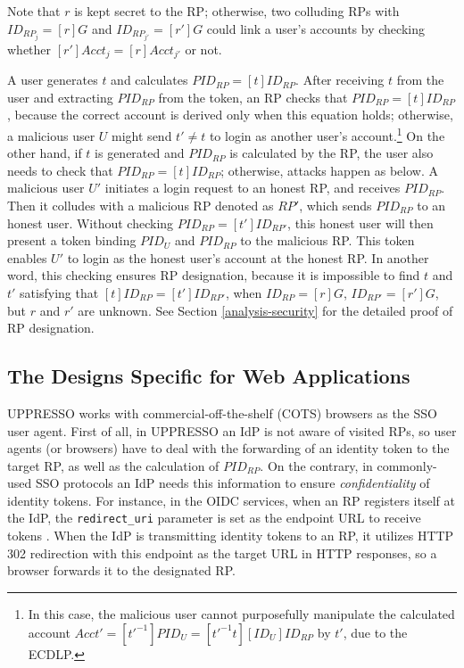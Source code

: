 Note that $r$ is kept secret to the RP; otherwise, two colluding RPs with $ID_{RP_j} = [r]G$ and $ID_{RP_{j'}} = [r']G$ could link a user's accounts by checking whether $[r']Acct_j = [r]Acct_{j'}$ or not.

A user generates $t$ and calculates $PID_{RP} = [t]ID_{RP}$.
After receiving $t$ from the user and extracting $PID_{RP}$ from the token,
    an RP checks that $PID_{RP} = [t]ID_{RP}$,
        because the correct account is derived only when this equation holds;
        otherwise, a malicious user $U$ might send $t' \neq t$ to login as another user's account.\footnote{In this case, the malicious user cannot purposefully  manipulate the calculated account $Acct' =  [t'^{-1}]PID_{U} = [t'^{-1}t][ID_U]ID_{RP}$ by $t'$,
        due to the ECDLP.}
On the other hand,
    if $t$ is generated and $PID_{RP}$ is calculated by the RP,
the user also needs to check that $PID_{RP} = [t]ID_{RP}$;
    otherwise, attacks happen as below.
A malicious user $U'$ initiates a login request to an honest RP,
    and receives $PID_{RP}$.
Then it colludes with a malicious RP denoted as $RP'$,
    which sends $PID_{RP}$ to an honest user.
Without checking $PID_{RP} = [t']ID_{RP'}$,
    this honest user will then present a token binding $PID_U$ and $PID_{RP}$ to the malicious RP.
This token enables $U'$ to login as the honest user's account at the honest RP.
In another word, this checking ensures RP designation,
    because it is impossible to find $t$ and $t'$ satisfying that
    $[t]ID_{RP} = [t']ID_{RP'}$,
        when $ID_{RP} = [r]G$, $ID_{RP'} = [r']G$, but $r$ and $r'$ are unknown.
See Section \ref{analysis-security} for the detailed proof of RP designation.

\subsection{The Designs Specific for Web Applications}
\label{sec:web-design}
UPPRESSO works with commercial-off-the-shelf (COTS) browsers as the SSO user agent.
First of all, in UPPRESSO an IdP is not aware of visited RPs,
 so user agents (or browsers) have to deal with the forwarding of an identity token
    to the target RP, as well as the calculation of $PID_{RP}$.
On the contrary,
    in commonly-used SSO protocols \cite{OpenIDConnect,rfc6749,SAML,SAMLIdentifier} an IdP needs this information to ensure \emph{confidentiality} of identity tokens.
For instance, in the OIDC services, when an RP registers itself at the IdP, the \verb+redirect_uri+ parameter
    is set as the endpoint URL to receive tokens  \cite{OpenIDConnect}.
When the IdP is transmitting identity tokens to an RP,
    it utilizes HTTP 302 redirection with this endpoint as the target URL in HTTP responses,
     so a browser forwards it to the designated RP.

